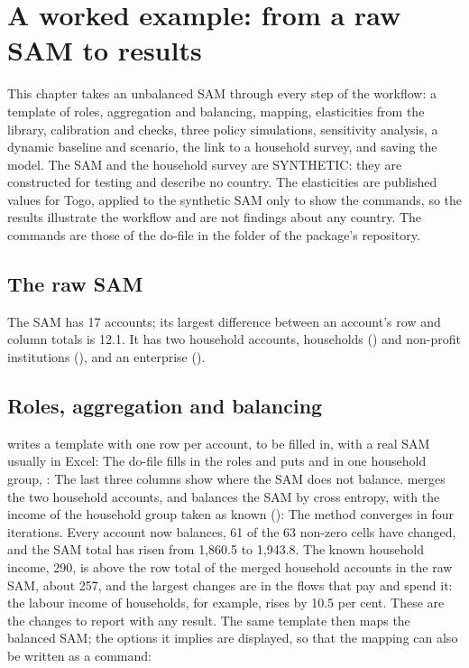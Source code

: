 \chapter{A worked example: from a raw SAM to results}\label{chap:example}

This chapter takes an unbalanced SAM through every step of the workflow: a
template of roles, aggregation and balancing, mapping, elasticities from the
library, calibration and checks, three policy simulations, sensitivity
analysis, a dynamic baseline and scenario, the link to a household survey, and
saving the model. The SAM and the household survey are SYNTHETIC: they are
constructed for testing and describe no country. The elasticities are
published values for Togo, applied to the synthetic SAM only to show the
commands, so the results illustrate the workflow and are not findings about
any country. The commands are those of the do-file
 in the  folder of the package's
repository.

\section{The raw SAM}

The SAM has 17 accounts; its largest difference between an account's row and
column totals is 12.1. It has two household accounts, households ()
and non-profit institutions (), and an enterprise ().

\section{Roles, aggregation and balancing}

 writes a template with one row per account, to be filled
in, with a real SAM usually in Excel:
The do-file fills in the roles and puts  and  in one
household group, :
The last three columns show where the SAM does not balance. 
merges the two household accounts, and  balances the SAM
by cross entropy, with the income of the household group taken as known
():
The method converges in four iterations. Every account now balances, 61 of
the 63 non-zero cells have changed, and the SAM total has risen from 1,860.5 to
1,943.8. The known household income, 290, is above the row total of the merged
household accounts in the raw SAM, about 257, and the largest changes are in
the flows that pay and spend it: the labour income of households, for
example, rises by 10.5 per cent. These are the changes to report with any result. The
same template then maps the balanced SAM; the options it implies are
displayed, so that the mapping can also be written as a command:

